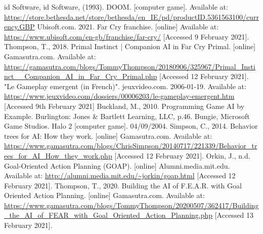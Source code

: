 \documentclass[10pt]{report}
\begin{document}
\begin{thebibliography}{}
    id Software, id Software, (1993). DOOM. [computer game]. Available at: \url{https://store.bethesda.net/store/bethesda/en_IE/pd/productID.5361563100/currency.GBP}
    Ubisoft.com. 2021. Far Cry franchise. [online] Available at: \url{https://www.ubisoft.com/en-gb/franchise/far-cry/} [Accessed 9 February 2021].
    Thompson, T., 2018. Primal Instinct | Companion AI in Far Cry Primal. [online] Gamasutra.com. Available at: \url{https://gamasutra.com/blogs/TommyThompson/20180906/325967/Primal_Instinct__Companion_AI_in_Far_Cry_Primal.php} [Accessed 12 February 2021].
    "Le Gameplay emergent (in French)". jeuxvideo.com. 2006-01-19. Available at: \url{https://www.jeuxvideo.com/dossiers/00006203/le-gameplay-emergent.htm} [Accessed 9th February 2021]
    Buckland, M., 2010. Programming Game AI by Example. Burlington: Jones \& Bartlett Learning, LLC, p.46.
    Bungie, Microsoft Game Studios. Halo 2 [computer game]. 04/09/2004.
    Simpson, C., 2014. Behavior trees for AI: How they work. [online] Gamasutra.com. Available at: \url{https://www.gamasutra.com/blogs/ChrisSimpson/20140717/221339/Behavior_trees_for_AI_How_they_work.php} [Accessed 12 February 2021].
    Orkin, J., n.d. Goal-Oriented Action Planning (GOAP). [online] Alumni.media.mit.edu. Available at: \url{http://alumni.media.mit.edu/~jorkin/goap.html} [Accessed 12 February 2021].
    Thompson, T., 2020. Building the AI of F.E.A.R. with Goal Oriented Action Planning. [online] Gamasutra.com. Available at: \url{https://www.gamasutra.com/blogs/TommyThompson/20200507/362417/Building_the_AI_of_FEAR_with_Goal_Oriented_Action_Planning.php} [Accessed 13 February 2021].
\end{thebibliography}
\end{document}
